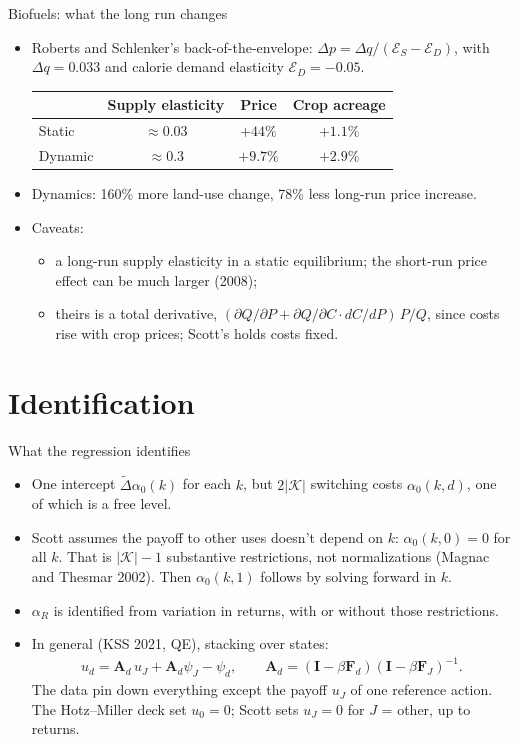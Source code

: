 \documentclass[aspectratio=169,11pt]{beamer}
\begin{document}
\begin{frame}{Biofuels: what the long run changes}
\small
\begin{itemize}
\item Roberts and Schlenker's back-of-the-envelope: $\Delta p = \Delta q / (\mathcal E_S - \mathcal E_D)$, with $\Delta q = 0.033$ and calorie demand elasticity $\mathcal E_D = -0.05$.
\par\smallskip
{\centering
\begin{tabular}{lccc}
\toprule
 & Supply elasticity & Price & Crop acreage\\
\midrule
Static & $\approx 0.03$ & $+44\%$ & $+1.1\%$\\
Dynamic & $\approx 0.3$ & $+9.7\%$ & $+2.9\%$\\
\bottomrule
\end{tabular}\par}
\smallskip
\item Dynamics: 160\% more land-use change, 78\% less long-run price increase.
\item Caveats:
\begin{itemize}
\item a long-run supply elasticity in a static equilibrium; the short-run price effect can be much larger (2008);
\item theirs is a total derivative, $(\partial Q/\partial P + \partial Q/\partial C \cdot dC/dP)\,P/Q$, since costs rise with crop prices; Scott's holds costs fixed.
\end{itemize}
\end{itemize}
\end{frame}

\section{Identification}

\begin{frame}{What the regression identifies}
\small
\begin{itemize}
\item One intercept $\tilde\Delta\alpha_0(k)$ for each $k$, but $2|\mathcal K|$ switching costs $\alpha_0(k,d)$, one of which is a free level.
\item Scott assumes the payoff to other uses doesn't depend on $k$: $\alpha_0(k,0) = 0$ for all $k$. That is $|\mathcal K| - 1$ \alert{substantive} restrictions, not normalizations (Magnac and Thesmar 2002). Then $\alpha_0(k,1)$ follows by solving forward in $k$.
\item $\alpha_R$ is identified from variation in returns, with or without those restrictions.
\item In general (KSS 2021, QE), stacking over states:
\begin{align*}
u_d = \symbf A_d\, u_J + \symbf A_d \psi_J - \psi_d, \qquad \symbf A_d = (\symbf I - \beta \symbf F_d)(\symbf I - \beta \symbf F_J)^{-1}.
\end{align*}
The data pin down everything except the payoff $u_J$ of one reference action. The Hotz--Miller deck set $u_0 = 0$; Scott sets $u_J = 0$ for $J$ = other, up to returns.
\end{itemize}
\end{frame}
\end{document}
